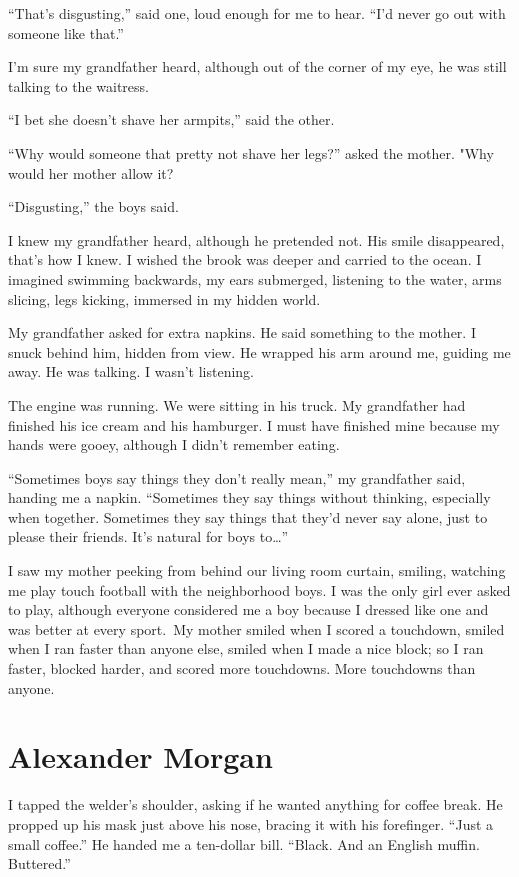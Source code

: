 ``That's disgusting,'' said one, loud enough for me to hear. ``I'd never
go out with someone like that.''

I'm sure my grandfather heard, although out of the corner of my eye, he
was still talking to the waitress.

``I bet she doesn't shave her armpits,'' said the other.

``Why would someone that pretty not shave her legs?'' asked the mother.
"Why would her mother allow it?

``Disgusting,'' the boys said. ~

I knew my grandfather heard, although he pretended not. His smile
disappeared, that's how I knew. I wished the brook was deeper and
carried to the ocean. I imagined swimming backwards, my ears submerged,
listening to the water, arms slicing, legs kicking, immersed in my
hidden world.

My grandfather asked for extra napkins. He said something to the mother.
I snuck behind him, hidden from view. He wrapped his arm around me,
guiding me away. He was talking. I wasn't listening.

The engine was running. We were sitting in his truck. My grandfather had
finished his ice cream and his hamburger. I must have finished mine
because my hands were gooey, although I didn't remember eating. ~

``Sometimes boys say things they don't really mean,'' my grandfather
said, handing me a napkin. ``Sometimes they say things without thinking,
especially when together. Sometimes they say things that they'd never
say alone, just to please their friends. It's natural for boys
to\ldots{}''

I saw my mother peeking from behind our living room curtain, smiling,
watching me play touch football with the neighborhood boys. I was the
only girl ever asked to play, although everyone considered me a boy
because I dressed like one and was better at every sport.~My mother
smiled when I scored a touchdown, smiled when I ran faster than anyone
else, smiled when I made a nice block; so I ran faster, blocked harder,
and scored more touchdowns. More touchdowns than anyone.

\chapter{Alexander Morgan}

\titlemark

I tapped the welder's shoulder, asking if he wanted anything for coffee
break. He propped up his mask just above his nose, bracing it with his
forefinger. ``Just a small coffee.'' He handed me a ten-dollar bill.
``Black. And an English muffin. Buttered.''

